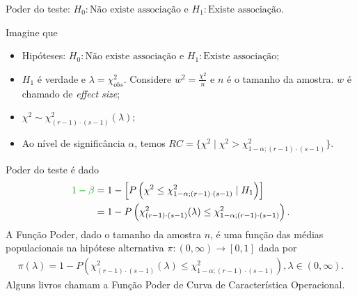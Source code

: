 \documentclass[9pt]{beamer}
\begin{document}
\begin{frame}{Poder do teste: $H_0:\mbox{Não existe associação}$ e $H_1:\mbox{Existe associação} $.}

\normalsize

Imagine que
\begin{itemize}
	\item Hipóteses: $H_0:\mbox{Não existe associação}$ e $H_1:\mbox{Existe associação} $;
	\item $H_1$ é verdade e $\lambda = \chi^2_{obs}$. Considere $w^2 = \frac{\chi^2}{n}$ e $n$ é o tamanho da amostra. $w$ é chamado de \textit{effect size};
	\item $\chi^2  \sim \chi^2_{(r-1)\cdot (s-1)}\left( \lambda \right)$;
	\item Ao nível de significância $\alpha$, temos $RC = \{ \chi^2 \mid \chi^2 > \chi^2_{1-\alpha; (r-1) \cdot (s-1)}  \}$.
\end{itemize}
\vfill	

Poder do teste é dado
\begin{align*}
\textcolor{important}{1-\beta} &=1 - \left[P\left(  \chi^2 \leq \chi_{1-\alpha; (r-1)\cdot (s-1)}^2 \mid H_1 \right)\right]\\
&= 1 - P\left( \chi_{(r-1)\cdot (s-1)}^2(\lambda) \leq \chi_{1-\alpha; (r-1)\cdot (s-1)}^2 \right).
\end{align*}
A \textcolor{important}{Função Poder}, dado o tamanho da amostra $n$, é uma função das médias populacionais na hipótese alternativa  $\pi: (0, \infty) \longrightarrow [0,1]$ dada por
\begin{align*}
\pi(\lambda) = 1 - P\left( \chi_{(r-1)\cdot (s-1)}^2(\lambda) \leq \chi_{1-\alpha; (r-1)\cdot (s-1)}^2 \right), \lambda \in (0, \infty).
\end{align*}
Alguns livros chamam a Função Poder de \textcolor{important}{Curva de Característica Operacional.}

\normalsize

\end{frame}
\end{document}
